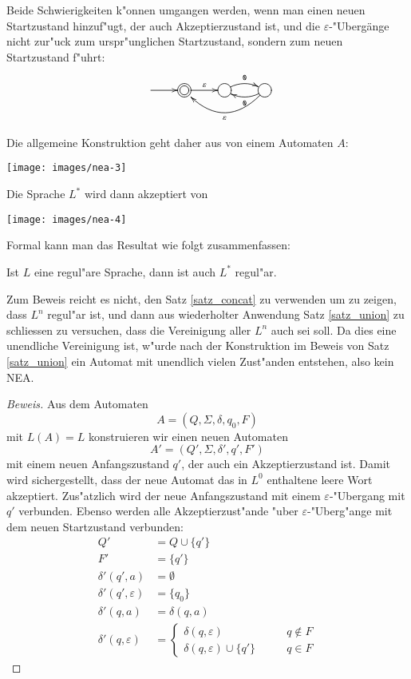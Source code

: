 Beide Schwierigkeiten k"onnen umgangen werden, wenn man einen
neuen Startzustand hinzuf"ugt, der auch Akzeptierzustand
ist, und die $\varepsilon$-"Uberg\"ange nicht zur"uck zum
urspr"unglichen Startzustand, sondern zum neuen Startzustand
f"uhrt:
\[
\entrymodifiers={++[o][F]}
\xymatrix{
*+\txt{}\ar[r]
	&*++[o][F=]{}\ar[r]^{\varepsilon}
		&{}\ar@/^/[r]^{\tt 0}
			&{}\ar@/^/[l]^{\tt 0} \ar@/^20pt/[ll]^{\varepsilon}
}
\]

Die allgemeine Konstruktion geht daher aus von einem Automaten $A$:
\begin{center}
\texttt{[image: images/nea-3]}
\end{center}
Die Sprache $L^*$ wird dann akzeptiert von
\begin{center}
\texttt{[image: images/nea-4]}
\end{center}

Formal kann man das Resultat wie folgt zusammenfassen:
\begin{satz}
\label{satz_star}
Ist $L$ eine regul"are Sprache, dann ist auch $L^*$ regul"ar.
\end{satz}

Zum Beweis reicht es nicht, den Satz \ref{satz_concat} zu verwenden
um zu zeigen, dass $L^n$ regul"ar ist, und dann aus wiederholter
Anwendung Satz \ref{satz_union} zu schliessen zu versuchen,
dass die Vereinigung aller $L^n$ auch sei soll. Da dies eine unendliche
Vereinigung ist, w"urde nach der Konstruktion im Beweis von Satz
\ref{satz_union} ein Automat mit unendlich vielen
Zust"anden entstehen, also kein NEA.

\begin{proof}[Beweis]
Aus dem Automaten
\[
A=(Q,\Sigma, \delta,q_0,F)
\]
mit $L(A)=L$ konstruieren wir einen neuen
Automaten
\[
A'=(Q',\Sigma,\delta',q',F')
\]
mit einem neuen Anfangszustand $q'$, der auch
ein Akzeptierzustand ist.
Damit wird sichergestellt, dass der neue Automat das in $L^0$
enthaltene leere Wort akzeptiert.
Zus"atzlich wird der neue Anfangszustand mit einem $\varepsilon$-"Ubergang
mit $q'$ verbunden. 
Ebenso werden alle Akzeptierzust"ande "uber $\varepsilon$-"Uberg"ange
mit dem neuen Startzustand verbunden:
\begin{align*}
Q'&=Q\cup \{q'\}\\
F'&=\{q'\}\\
\delta'(q',a)&=\emptyset\\
\delta'(q',\varepsilon)&= \{q_0\}\\
\delta'(q,a)&= \delta(q,a)\\
\delta'(q,\varepsilon)&=\begin{cases}
\delta(q,\varepsilon)          &\qquad q\not\in F\\
\delta(q,\varepsilon)\cup\{q'\}&\qquad q\in F
\end{cases}
\end{align*}
\end{proof}

